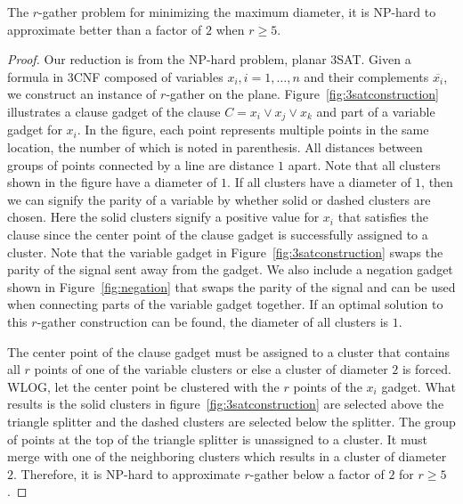 \begin{theorem}\label{thm:hardness1}
The $r$-gather problem for minimizing the maximum diameter, it is NP-hard to approximate better than a factor of $2$ when $r\geq5$.
\end{theorem}
\begin{proof}
Our reduction is from the NP-hard problem, planar 3SAT.  Given a formula in 3CNF composed of variables $x_i, i = 1,\dots,n$ and their complements $\overline{x_i}$, we construct an instance of $r$-gather on the plane.  Figure~\ref{fig:3satconstruction} illustrates a clause gadget of the clause $C = x_i \vee x_j \vee x_k$ and part of a variable gadget for $x_i$.  In the figure, each point represents multiple points in the same location, the number of which is noted in parenthesis.  All distances between groups of points connected by a line are distance $1$ apart.  Note that all clusters shown in the figure have a diameter of $1$.  If all clusters have a diameter of $1$, then we can signify the parity of a variable by whether solid or dashed clusters are chosen.  Here the solid clusters signify a positive value for $x_i$ that satisfies the clause since the center point of the clause gadget is successfully assigned to a cluster.  Note that the variable gadget in Figure~\ref{fig:3satconstruction} swaps the parity of the signal sent away from the gadget.  We also include a negation gadget shown in Figure~\ref{fig:negation} that swaps the parity of the signal and can be used when connecting parts of the variable gadget together.  If an optimal solution to this $r$-gather construction can be found, the diameter of all clusters is $1$.


The center point of the clause gadget must be assigned to a cluster that contains all $r$ points of one of the variable clusters or else a cluster of diameter $2$ is forced.  WLOG, let the center point be clustered with the $r$ points of the $x_i$ gadget.  What results is the solid clusters in figure~\ref{fig:3satconstruction} are selected above the triangle splitter and the dashed clusters are selected below the splitter.  The group of points at the top of the triangle splitter is unassigned to a cluster.  It must merge with one of the neighboring clusters which results in a cluster of diameter $2$.  Therefore, it is NP-hard to approximate $r$-gather below a factor of $2$ for $r\geq5$.
\end{proof}

